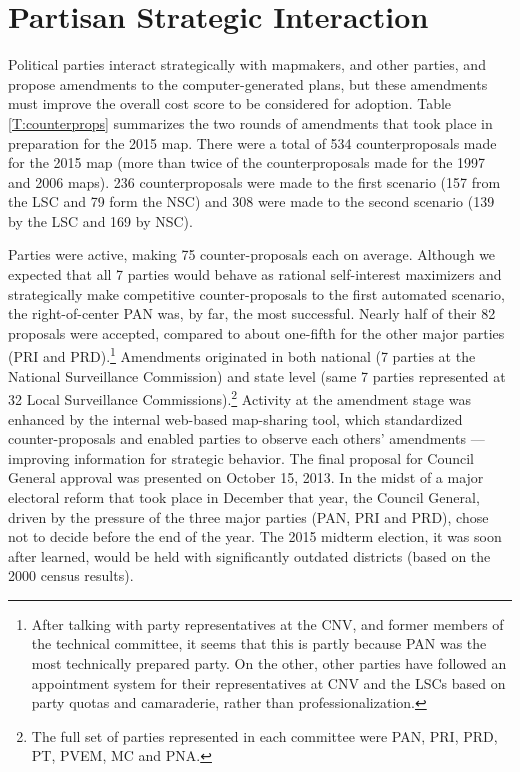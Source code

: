 \documentclass[letter,12pt]{article}
\begin{document}
\section{Partisan Strategic Interaction}

Political parties interact strategically with mapmakers, and other parties, and propose amendments to the computer-generated plans, but these amendments must improve the overall cost score to be considered for adoption. Table \ref{T:counterprops} summarizes the two rounds of amendments that took place in preparation for the 2015 map. There were a total of 534 counterproposals made for the 2015 map (more than twice of the counterproposals made for the 1997 and 2006 maps). 236 counterproposals were made to the first scenario (157 from the LSC and 79 form the NSC) and 308 were made to the second scenario (139 by the LSC and 169 by NSC).

Parties were active, making 75 counter-proposals each on average. Although we expected that all 7 parties would behave as rational self-interest maximizers and strategically make competitive counter-proposals to the first automated scenario, the right-of-center PAN was, by far, the most successful. Nearly half of their 82 proposals were accepted, compared to about one-fifth for the other major parties (PRI and PRD).\footnote{After talking with party representatives at the CNV, and former members of the technical committee, it seems that this is partly because PAN was the most technically prepared party. On the other, other parties have followed an appointment system for their representatives at CNV and the LSCs based on party quotas and camaraderie, rather than professionalization.} Amendments originated in both national (7 parties at the National Surveillance Commission) and state level (same 7 parties represented at 32 Local Surveillance Commissions).\footnote{The full set of parties represented in each committee were PAN, PRI, PRD, PT, PVEM, MC and PNA.} Activity at the amendment stage was enhanced by the internal web-based map-sharing tool, which standardized counter-proposals and enabled parties to observe each others' amendments --- improving information for strategic behavior. The final proposal for Council General approval was presented on October 15, 2013. In the midst of a major electoral reform that took place in December that year, the Council General, driven by the pressure of the three major parties (PAN, PRI and PRD), chose not to decide before the end of the year. The 2015 midterm election, it was soon after learned, would be held with significantly outdated districts (based on the 2000 census results). 
\end{document}

